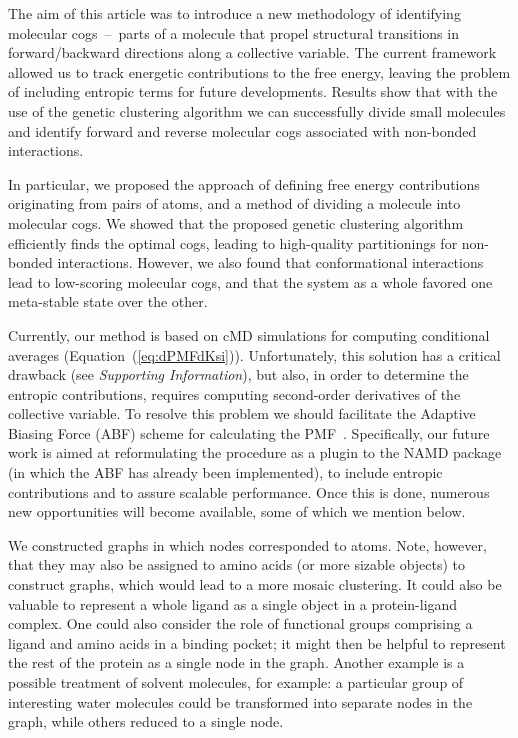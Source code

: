 \documentclass[a4paper,11pt,twoside]{book}%
\begin{document}
{\color{black}
The aim of this article was to introduce a new methodology of identifying molecular cogs~--~parts of a molecule that propel structural transitions in forward/backward directions along a collective variable.
The current framework allowed us to track energetic contributions to the free energy, leaving the problem of including entropic terms for future developments.
Results show that with the use of the genetic clustering algorithm we can successfully divide small molecules and identify forward and reverse molecular cogs associated with non-bonded interactions.}

In particular, we proposed the approach of defining free energy contributions originating from pairs of atoms, and a method of dividing a molecule into molecular cogs.
We showed that the proposed genetic clustering algorithm efficiently finds the optimal cogs, leading to high-quality partitionings for non-bonded interactions.
However, we also found that conformational interactions lead to low-scoring molecular cogs, and that the system as a whole favored one meta-stable state over the other.

Currently, our method is based on {\color{black}cMD} simulations for computing conditional averages (Equation~(\ref{eq:dPMFdKsi})).
Unfortunately, this solution has a critical drawback (see \emph{Supporting Information}), but also, in order to determine the entropic contributions, requires computing second-order derivatives of the collective variable.
To resolve this problem we should facilitate the Adaptive Biasing Force (ABF) scheme for calculating the PMF~\cite{comer2014adaptive}.
{\color{black}Specifically, our future work is aimed at reformulating the procedure as a plugin to the NAMD package (in which the ABF has already been implemented), to include entropic contributions and to assure scalable performance.
Once this is done, numerous new opportunities will become available, some of which we mention below.}

We constructed graphs in which nodes corresponded to atoms.
Note, however, that they may also be assigned to amino acids (or more sizable objects) to construct graphs, which would lead to a more mosaic clustering.
It could also be valuable to represent a whole ligand as a single object in a protein-ligand complex.
One could also consider the role of functional groups comprising a ligand and amino acids in a binding pocket; it might then be helpful to represent the rest of the protein as a single node in the graph.
{\color{black}Another example is a possible treatment of solvent molecules, for example: a particular group of interesting water molecules could be transformed into separate nodes in the graph, while others reduced to a single node.}
\end{document}
